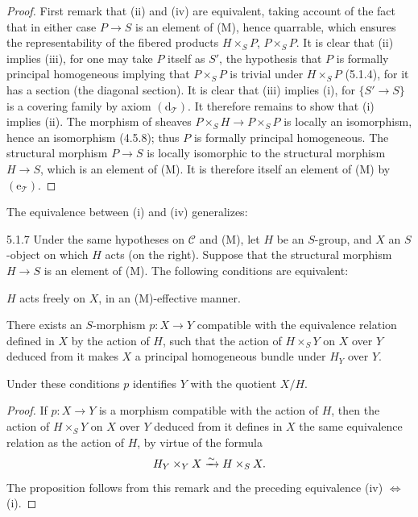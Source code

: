 \begin{proof}
First remark that (ii) and (iv) are equivalent, taking
account of the fact that in either case \(P\to S\)
is an element of (M), hence quarrable, which
ensures the representability of the fibered products
\(H\times_S P\), \(P\times_S P\).
It is clear that (ii) implies (iii), for one may take
\(P\) itself as \(S'\), the hypothesis that \(P\)
is formally principal homogeneous implying that
\(P\times_S P\) is trivial under \(H\times_S P\)
(5.1.4), for it has a section (the diagonal section).
It is clear that (iii) implies (i), for \(\{S'\to S\}\)
is a covering family by axiom \((\mathrm d_{\mathcal T})\).
It therefore remains to show that (i) implies (ii).
The morphism of sheaves \(P\times_S H\to P\times_S P\)
is locally an isomorphism, hence an isomorphism (4.5.8);
thus \(P\) is formally principal homogeneous.
The structural morphism \(P\to S\) is locally isomorphic
to the structural morphism \(H\to S\), which is an element
of (M). It is therefore itself an element of (M)
by \((\mathrm e_{\mathcal T})\).
\end{proof}
The equivalence between (i) and (iv) generalizes:
\begin{proposition}{5.1.7}\label{IV.5.1.7}
Under the same hypotheses on \(\mathcal C\) and (M),
let \(H\) be an \(S\)-group, and \(X\) an \(S\)-object
on which \(H\) acts (on the right).
Suppose that the structural morphism \(H\to S\)
is an element of (M). The following conditions are equivalent:
\begin{enumeratei}
\item \(H\) acts freely on \(X\), in an (M)-effective manner.
\item There exists an \(S\)-morphism \(p:X\to Y\)
compatible with the equivalence relation defined in
\(X\) by the action of \(H\), such that the action
of \(H\times_S Y\) on \(X\) over \(Y\) deduced from
it makes \(X\) a principal homogeneous bundle under
\(H_Y\) over \(Y\).
\end{enumeratei}
Under these conditions \(p\) identifies \(Y\) with
the quotient \(X/H\).
\end{proposition}
\begin{proof}
If \(p:X\to Y\) is a morphism compatible with the
action of \(H\), then the action of \(H\times_S Y\)
on \(X\) over \(Y\) deduced from it defines in \(X\)
the same equivalence relation as the action of \(H\),
by virtue of the formula
\[
H_Y\times_Y X\xrightarrow{\sim} H\times_S X.
\]
The proposition follows from this remark and the
preceding equivalence (iv) \(\Leftrightarrow\) (i).
\end{proof}
